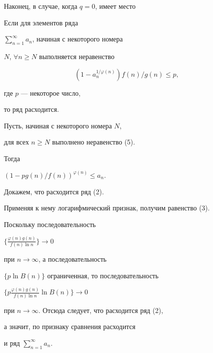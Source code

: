 Наконец, в случае, когда $q=0$, имеет место








\begin{thm}


Если для элементов ряда 


$\sum\limits_{n=1}^{\infty}a_n$, начиная с некоторого номера


$N$, $\forall n \geq N$ выполняется неравенство


\begin{equation}


( 1-a_n^{1/\varphi (n)})f(n)/g(n)\leq p,


\end{equation}


где $p$ --- некоторое число,


то ряд расходится.


\end{thm}








\begin{pf}


Пусть, начиная с некоторого номера $N$,


для всех $n \geq N$ выполнено неравенство (5).


Тогда


$(1-p g(n)/f(n))^{\varphi (n)}\leq a_n$.


Докажем, что расходится ряд (2).


Применяя к нему логарифмический признак, получим равенство (3).





Поскольку последовательность


$\{\frac{\varphi (n) g(n)}{f(n) \ln n}\} \to 0$


при $n \to \infty$, а последовательность


$\{p\ln B(n)\}$ ограниченная, то последовательность


$\{ p\frac{\varphi (n) g(n)}{f(n) \ln n} \ln B(n)\}\to 0$


при $n \to \infty$. Отсюда следует, что расходится ряд (2),


а значит, по признаку сравнения расходится


и ряд $\sum\limits_{n=1}^{\infty}a_n$.


\end{pf}






